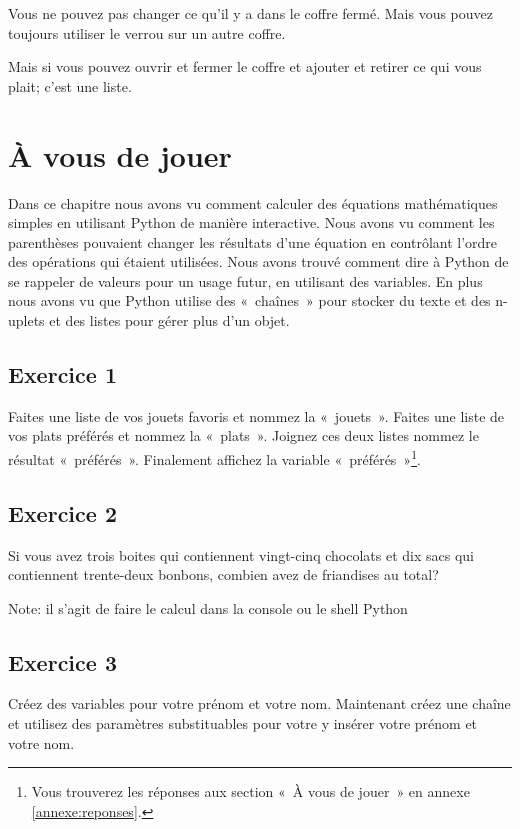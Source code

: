 Vous ne pouvez pas changer ce qu'il y a dans le coffre fermé. Mais vous pouvez toujours utiliser le verrou  sur un autre coffre.

Mais si vous pouvez ouvrir et fermer le coffre et ajouter et retirer ce qui vous plait; c'est une liste.

\section{À vous de jouer\label{pratique:8}}

Dans ce chapitre nous avons vu comment calculer des équations mathématiques simples en utilisant Python de manière interactive. Nous avons vu comment les parenthèses pouvaient changer les résultats d'une équation en contrôlant l'ordre des opérations qui étaient utilisées. Nous avons trouvé comment dire à Python de se rappeler de valeurs pour un usage futur, en utilisant des variables. En plus nous avons vu que Python utilise des «~chaînes~» pour stocker du texte et des n-uplets et des listes pour gérer plus d'un objet.

\subsection{Exercice 1}
Faites une liste de vos jouets favoris et nommez la «~jouets~». Faites une liste de vos plats préférés et nommez la «~plats~». Joignez ces deux listes nommez le résultat «~préférés~». Finalement affichez la variable «~préférés~»\footnote{Vous trouverez les réponses aux section «~À vous de jouer~» en annexe \ref{annexe:reponses}.}.

\subsection{Exercice 2}
Si vous avez trois boites qui contiennent vingt-cinq chocolats et dix sacs qui contiennent trente-deux bonbons, combien avez de friandises au total? 

Note: il s'agit de faire le calcul dans la console ou le shell Python

\subsection{Exercice 3}
Créez des variables pour votre prénom et votre nom. Maintenant créez une chaîne et utilisez des paramètres substituables pour votre y insérer votre prénom et votre nom.\\


